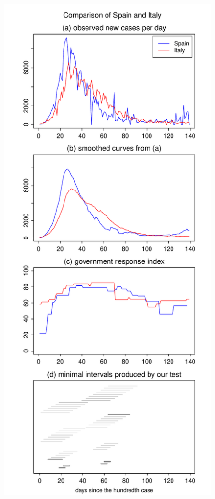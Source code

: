 \documentclass[a4paper,12pt]{article}
\numberwithin{equation}{section}
\begin{document}
\begin{figure}[p!]
\begin{minipage}[t]{0.49\textwidth}
\includegraphics[width=\textwidth]{plots/ESP_vs_ITA}

\end{minipage}
\end{figure}
\end{document}
